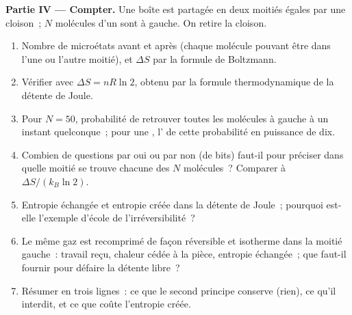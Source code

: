 \begin{problem}
\medskip
\noindent\textbf{Partie IV --- Compter.}
Une boîte est partagée en deux moitiés égales par une cloison~; $N$
molécules d'un  sont à gauche. On retire la cloison.
\begin{enumerate}[resume]
  \item Nombre de microétats avant et après (chaque molécule pouvant être
        dans l'une ou l'autre moitié), et $\Delta S$ par la formule de Boltzmann.
  \item Vérifier avec $\Delta S = nR\ln2$, obtenu par la formule
        thermodynamique de la détente de Joule.
  \item Pour $N = 50$, probabilité de retrouver toutes les molécules à
        gauche à un instant quelconque~; pour une , l'
        de cette probabilité en puissance de dix.
  \item Combien de questions par oui ou par non (de bits) faut-il pour
        préciser dans quelle moitié se trouve chacune des
        $N$ molécules~? Comparer à $\Delta S/(k_B\ln2)$.
  \item Entropie échangée et entropie créée dans la détente de Joule~;
        pourquoi est-elle l'exemple d'école de l'irréversibilité~?
  \item Le même gaz est recomprimé de façon réversible et isotherme dans la
        moitié gauche~: travail reçu, chaleur cédée à la pièce, entropie
        échangée~; que faut-il fournir pour défaire la détente libre~?
  \item Résumer en trois lignes~: ce que le second principe conserve (rien),
        ce qu'il interdit, et ce que coûte l'entropie créée.
\end{enumerate}
\end{problem}
